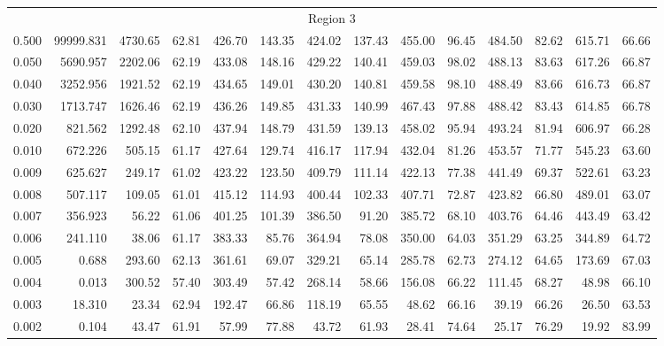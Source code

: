 \begin{tabular}{@{}lrrrrrrrrrrrrr@{}}
\midrule
\multicolumn{14}{c}{Region 3} \\
\cmidrule{1-14}
0.500 & 99999.831 & 4730.65 & 62.81 & 426.70 & 143.35 & 424.02 & 137.43 & 455.00 & 96.45 & 484.50 & 82.62 & 615.71 & 66.66 \\
0.050 & 5690.957 & 2202.06 & 62.19 & 433.08 & 148.16 & 429.22 & 140.41 & 459.03 & 98.02 & 488.13 & 83.63 & 617.26 & 66.87 \\
0.040 & 3252.956 & 1921.52 & 62.19 & 434.65 & 149.01 & 430.20 & 140.81 & 459.58 & 98.10 & 488.49 & 83.66 & 616.73 & 66.87 \\
0.030 & 1713.747 & 1626.46 & 62.19 & 436.26 & 149.85 & 431.33 & 140.99 & 467.43 & 97.88 & 488.42 & 83.43 & 614.85 & 66.78 \\
0.020 & 821.562 & 1292.48 & 62.10 & 437.94 & 148.79 & 431.59 & 139.13 & 458.02 & 95.94 & 493.24 & 81.94 & 606.97 & 66.28 \\
0.010 & 672.226 & 505.15 & 61.17 & 427.64 & 129.74 & 416.17 & 117.94 & 432.04 & 81.26 & 453.57 & 71.77 & 545.23 & 63.60 \\
0.009 & 625.627 & 249.17 & 61.02 & 423.22 & 123.50 & 409.79 & 111.14 & 422.13 & 77.38 & 441.49 & 69.37 & 522.61 & 63.23 \\
0.008 & 507.117 & 109.05 & 61.01 & 415.12 & 114.93 & 400.44 & 102.33 & 407.71 & 72.87 & 423.82 & 66.80 & 489.01 & 63.07 \\
0.007 & 356.923 & 56.22 & 61.06 & 401.25 & 101.39 & 386.50 & 91.20 & 385.72 & 68.10 & 403.76 & 64.46 & 443.49 & 63.42 \\
0.006 & 241.110 & 38.06 & 61.17 & 383.33 & 85.76 & 364.94 & 78.08 & 350.00 & 64.03 & 351.29 & 63.25 & 344.89 & 64.72 \\
0.005 & 0.688 & 293.60 & 62.13 & 361.61 & 69.07 & 329.21 & 65.14 & 285.78 & 62.73 & 274.12 & 64.65 & 173.69 & 67.03 \\
0.004 & 0.013 & 300.52 & 57.40 & 303.49 & 57.42 & 268.14 & 58.66 & 156.08 & 66.22 & 111.45 & 68.27 & 48.98 & 66.10 \\
0.003 & 18.310 & 23.34 & 62.94 & 192.47 & 66.86 & 118.19 & 65.55 & 48.62 & 66.16 & 39.19 & 66.26 & 26.50 & 63.53 \\
0.002 & 0.104 & 43.47 & 61.91 & 57.99 & 77.88 & 43.72 & 61.93 & 28.41 & 74.64 & 25.17 & 76.29 & 19.92 & 83.99 \\

\bottomrule
\end{tabular}
